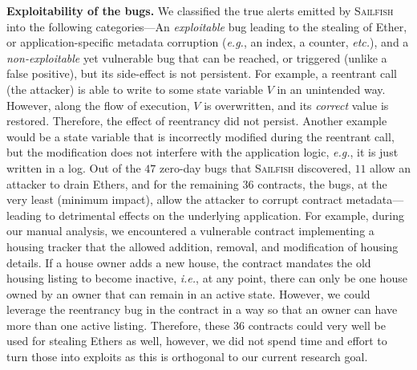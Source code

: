 \documentclass[conference, romanappendices]{tex/IEEEtran}
\theoremstyle{bfnote}
\newcommand{\toolname}{\textsc{Sailfish}\xspace}
\newcommand{\ether}{{Ether}\xspace}
\newcommand{\reentrancy}{{reentrancy}\xspace}
\newcommand{\etc}{\textit{etc.}}
\newcommand{\eg}{\textit{e.g.}}
\newcommand{\ie}{\textit{i.e.}}
\newcommand{\zeroDays}{47}
\begin{document}
\noindent
\textbf{Exploitability of the bugs.}
We classified the true alerts emitted by \toolname{} into the following categories---An \textit{exploitable} bug leading to the stealing of \ether, or application-specific metadata corruption (\eg, an index, a counter, \etc), and a \textit{non-exploitable} yet vulnerable bug that can be reached, or triggered (unlike a false positive), but its side-effect is not persistent.
For example, a reentrant call (the attacker) is able to write to some state variable $V$ in an unintended way.
However, along the flow of execution, $V$ is overwritten, and its \textit{correct} value is restored.
Therefore, the effect of \reentrancy did not persist.
Another example would be a state variable that is incorrectly modified during the reentrant call, but the modification does not interfere with the application logic, \eg, it is just written in a log.
Out of the $\zeroDays$ zero-day bugs that \toolname discovered, $11$ allow an attacker to drain Ethers, and for the remaining $36$ contracts, the bugs, at the very least (minimum impact), allow the attacker to corrupt contract metadata---leading to detrimental effects on the underlying application.
For example, during our manual analysis, we encountered a vulnerable contract implementing a housing tracker that the allowed addition, removal, and modification of housing details.
If a house owner adds a new house, the contract mandates the old housing listing to become inactive, \ie, at any point, there can only be one house owned by an owner that can remain in an active state.
However, we could leverage the \reentrancy bug in the contract in a way so that an owner can have more than one active listing.
Therefore, these $36$ contracts could very well be used for stealing Ethers as well, however, we did not spend time and effort to turn those into exploits as this is orthogonal to our current research goal.
\end{document}
